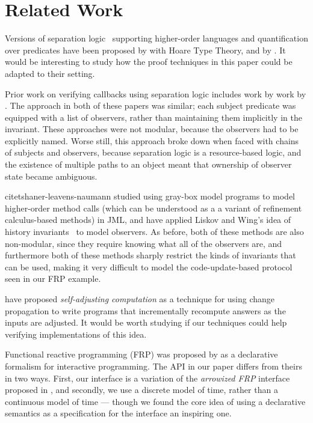 \section{Related Work}

Versions of separation logic~\cite{sep-logic} supporting higher-order
languages and quantification over predicates have been proposed by
\citet{htt} with Hoare Type Theory, and by
\citet{parkinson-bierman}. It would be interesting to study how the
proof techniques in this paper could be adapted to their setting.

Prior work on verifying callbacks using separation logic includes work
by \citet{tldi09,ftfjp07} work by
\citet{parkinson-iwaco-07}. The approach in both of these
papers was similar; each subject predicate was equipped with a list of
observers, rather than maintaining them implicitly in the
invariant. These approaches were not modular, because the observers
had to be explicitly named. Worse still, this approach broke down when
faced with chains of subjects and observers, because separation logic
is a resource-based logic, and the existence of multiple paths to an
object meant that ownership of observer state became ambiguous.

citet{shaner-leavens-naumann} studied using gray-box model
programs to model higher-order method calls (which can be understood
as a a variant of refinement calculus-based methods) in JML, and 
\citet{history-invariants} have applied Liskov and Wing's
idea of history invariants~\cite{liskov-wing} to model observers. As
before, both of these methods are also non-modular, since they require
knowing what all of the observers are, and furthermore both of these
methods sharply restrict the kinds of invariants that can be used,
making it very difficult to model the code-update-based protocol seen
in our FRP example.

\citet{self-adjusting} have proposed
\emph{self-adjusting computation} as a technique for using change
propagation to write programs that incrementally
recompute answers as the inputs are adjusted. It would be worth 
studying if our techniques could help verifying implementations of this
idea.

Functional reactive programming (FRP) was proposed by \citet{frp} as a
declarative formalism for interactive programming. The API in our
paper differs from theirs in two ways. First, our interface is a
variation of the \emph{arrowized FRP} interface proposed in
\cite{afrp}, and secondly, we use a discrete model of time, rather
than a continuous model of time --- though we found the core idea of
using a declarative semantics as a specification for the interface an
inspiring one.

